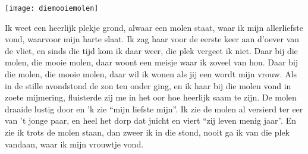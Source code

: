 \begin{intersong}
    \texttt{[image: diemooiemolen]}
\end{intersong}
\beginverse
Ik weet een heerlijk plekje grond, alwaar een molen staat,
waar ik mijn allerliefste vond, waarvoor mijn harte slaat.
Ik zag haar voor de eerste keer aan d’oever van de vliet, 
en sinds die tijd kom ik daar weer, die plek vergeet ik niet.
\endverse
\beginchorus
Daar bij die molen, die mooie molen,
daar woont een meisje waar ik zoveel van hou.
Daar bij die molen, die mooie molen,
daar wil ik wonen als jij een wordt mijn vrouw.
\endchorus
\beginverse
Als in de stille avondstond de zon ten onder ging,
en ik haar bij die molen vond in zoete mijmering,
fluisterde zij me in het oor hoe heerlijk saam te zijn.
De molen draaide lustig door en 'k zie “mijn liefste mijn”.
\endverse
\beginverse
Ik zie de molen al versierd ter eer van 't jonge paar,
en heel het dorp dat juicht en viert “zij leven menig jaar”.
En zie ik trots de molen staan, dan zweer ik in die stond,
nooit ga ik van die plek vandaan, waar ik mijn vrouwtje vond.
\endverse
\endsong